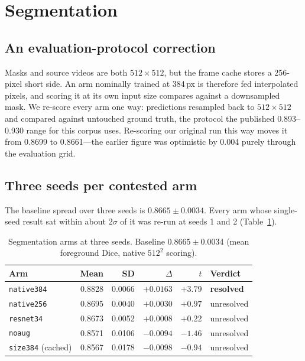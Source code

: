 \documentclass[conference]{IEEEtran}
\begin{document}
\section{Segmentation}
\label{sec:seg}

\subsection{An evaluation-protocol correction}

Masks and source videos are both $512\times512$, but the frame cache stores a
256-pixel short side. An arm nominally trained at 384\,px is therefore fed
interpolated pixels, and scoring it at its own input size compares against a
downsampled mask. We re-score every arm one way: predictions resampled back to
$512\times512$ and compared against untouched ground truth, the protocol the
published 0.893--0.930 range for this corpus uses. Re-scoring our original run
this way moves it from 0.8699 to 0.8661---the earlier figure was optimistic by
0.004 purely through the evaluation grid.

\subsection{Three seeds per contested arm}

The baseline spread over three seeds is $0.8665\pm0.0034$. Every arm whose
single-seed result sat within about $2\sigma$ of it was re-run at seeds 1 and 2
(Table~\ref{tab:seg}).

\begin{table}[t]
\caption{Segmentation arms at three seeds. Baseline $0.8665\pm0.0034$
(mean foreground Dice, native $512^2$ scoring).}
\label{tab:seg}
\centering
\footnotesize
\setlength{\tabcolsep}{3.5pt}
\begin{tabular}{lrrrrl}
\toprule
Arm & Mean & SD & $\Delta$ & $t$ & Verdict \\
\midrule
\texttt{native384} & 0.8828 & 0.0066 & $+0.0163$ & $+3.79$ & \textbf{resolved} \\
\texttt{native256} & 0.8695 & 0.0040 & $+0.0030$ & $+0.97$ & unresolved \\
\texttt{resnet34} & 0.8673 & 0.0052 & $+0.0008$ & $+0.22$ & unresolved \\
\texttt{noaug} & 0.8571 & 0.0106 & $-0.0094$ & $-1.46$ & unresolved \\
\texttt{size384} (cached) & 0.8567 & 0.0178 & $-0.0098$ & $-0.94$ & unresolved \\
\bottomrule
\end{tabular}
\end{table}
\end{document}
